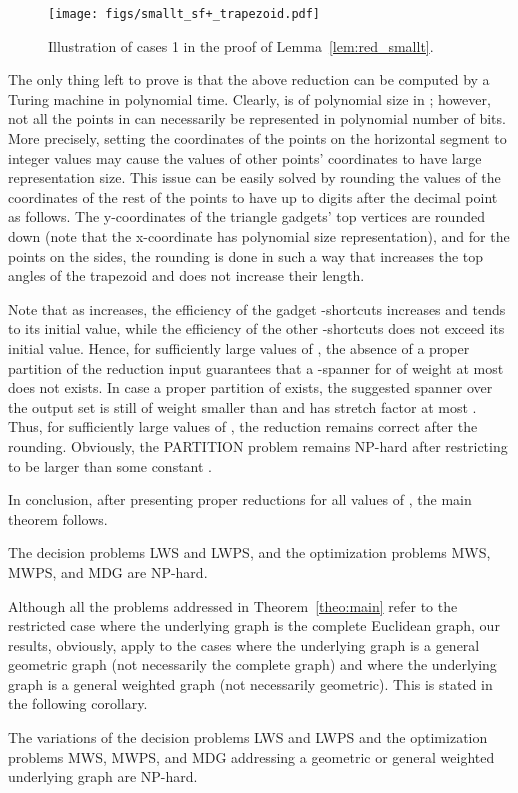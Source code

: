 \documentclass[a4paper]{llncs}
\begin{document}
\begin{figure}[htb]
    \centering
        \texttt{[image: figs/smallt\_sf+\_trapezoid.pdf]}
    \caption{Illustration of cases 1 in the proof of Lemma~\ref{lem:red_smallt}.}
    \label{fig:smallt_sf+}
\end{figure}


The only thing left to prove is that the above reduction can be computed 
by a Turing machine in polynomial time.
Clearly,  is of polynomial size in ; however, not all the points in  
can necessarily be represented in 
polynomial number of bits.
More precisely, setting the coordinates of the points on the horizontal
segment to integer values may
cause the values of other points' coordinates to have large representation size.
This issue can be easily solved by rounding the values of the coordinates
of the rest of the points to have up to  digits after the decimal point as follows.
The y-coordinates of the triangle gadgets' top vertices are rounded down
(note that the x-coordinate has polynomial size representation), 
and for the points on the sides, the rounding is done in such a way that
increases the top angles of the trapezoid and does not increase their length.

Note that as  increases, the efficiency of the gadget -shortcuts
increases and tends to its initial value,
while the efficiency of the other -shortcuts does not exceed its initial value.
Hence, for sufficiently large values of , the absence of 
a proper partition of the reduction input  guarantees that a -spanner for 
of weight at most  does not exists.
In case a proper partition of  exists,
the suggested spanner over the output set  is still of weight smaller than 
and has stretch factor at most . 
Thus, for sufficiently large values of , 
the reduction remains correct after the rounding.
Obviously, the PARTITION problem remains NP-hard after restricting  to be larger
than some constant . 

In conclusion, after presenting proper reductions for all values of , the main theorem follows.

\begin{theorem}\label{theo:main}
The decision problems LWS and LWPS, and the optimization problems MWS, MWPS, and MDG are NP-hard.
\end{theorem}

Although all the problems addressed in Theorem~\ref{theo:main} refer to the restricted case 
where the underlying graph is the complete Euclidean graph, 
our results, obviously, apply to the cases where the underlying graph is
a general geometric graph (not necessarily the complete graph) and 
where the underlying graph is a general weighted graph (not necessarily geometric).
This is stated in the following corollary.


\begin{corollary}
The variations of the decision problems LWS and LWPS and the optimization problems MWS, MWPS, and MDG 
addressing a geometric or general weighted underlying graph are NP-hard.
\end{corollary}





\end{document}

